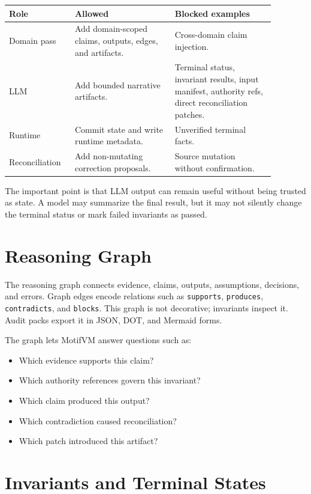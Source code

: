 \documentclass[11pt]{article}
\begin{document}
\begin{center}
\begin{tabular}{p{0.2\linewidth}p{0.34\linewidth}p{0.34\linewidth}}
\toprule
\textbf{Role} & \textbf{Allowed} & \textbf{Blocked examples} \\
\midrule
Domain pass & Add domain-scoped claims, outputs, edges, and artifacts. & Cross-domain claim injection. \\
LLM & Add bounded narrative artifacts. & Terminal status, invariant results, input manifest, authority refs, direct reconciliation patches. \\
Runtime & Commit state and write runtime metadata. & Unverified terminal facts. \\
Reconciliation & Add non-mutating correction proposals. & Source mutation without confirmation. \\
\bottomrule
\end{tabular}
\end{center}

The important point is that LLM output can remain useful without being trusted as state. A model may summarize the final result, but it may not silently change the terminal status or mark failed invariants as passed.

\section{Reasoning Graph}

The reasoning graph connects evidence, claims, outputs, assumptions, decisions, and errors. Graph edges encode relations such as \texttt{supports}, \texttt{produces}, \texttt{contradicts}, and \texttt{blocks}. This graph is not decorative; invariants inspect it. Audit packs export it in JSON, DOT, and Mermaid forms.

The graph lets MotifVM answer questions such as:

\begin{itemize}[leftmargin=1.5em]
  \item Which evidence supports this claim?
  \item Which authority references govern this invariant?
  \item Which claim produced this output?
  \item Which contradiction caused reconciliation?
  \item Which patch introduced this artifact?
\end{itemize}

\section{Invariants and Terminal States}
\end{document}
